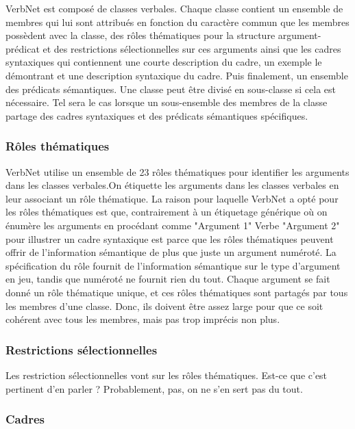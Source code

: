 \documentclass[12pt,maitrise,frenchb,natbib,twoside,initial]{dms}
\numberwithin{equation}{section}
\numberwithin{table}{chapter}
\numberwithin{figure}{chapter}
\begin{document}
VerbNet est composé de classes verbales. Chaque classe contient un ensemble de membres qui lui sont attribués en fonction du caractère commun que les membres possèdent avec la classe, des rôles thématiques pour la structure argument-prédicat et des restrictions sélectionnelles sur ces arguments ainsi que les cadres syntaxiques qui contiennent une courte description du cadre, un exemple le démontrant et une description syntaxique du cadre. Puis finalement, un ensemble des prédicats sémantiques. Une classe peut être divisé en sous-classe si cela est nécessaire. Tel sera le cas lorsque un sous-ensemble des membres de la classe partage des cadres syntaxiques et des prédicats sémantiques spécifiques.

\subsubsection{Rôles thématiques}

VerbNet utilise un ensemble de 23 rôles thématiques pour identifier les arguments dans les classes verbales.On étiquette les arguments dans les classes verbales en leur associant un rôle thématique. La raison pour laquelle VerbNet a opté pour les rôles thématiques est que, contrairement à un étiquetage générique où on énumère les arguments en procédant comme "Argument 1" Verbe "Argument 2" pour illustrer un cadre syntaxique est parce que les rôles thématiques peuvent offrir de l'information sémantique de plus que juste un argument numéroté. La spécification du rôle fournit de l'information sémantique sur le type d'argument en jeu, tandis que numéroté ne fournit rien du tout. Chaque argument se fait donné un rôle thématique unique, et ces rôles thématiques sont partagés par tous les membres d'une classe. Donc, ils doivent être assez large pour que ce soit cohérent avec tous les membres, mais pas trop imprécis non plus.

\subsubsection{Restrictions sélectionnelles}

Les restriction sélectionnelles vont sur les rôles thématiques. Est-ce que c'est pertinent d'en parler ? Probablement, pas, on ne s'en sert pas du tout. 

\subsubsection{Cadres}
\end{document}
